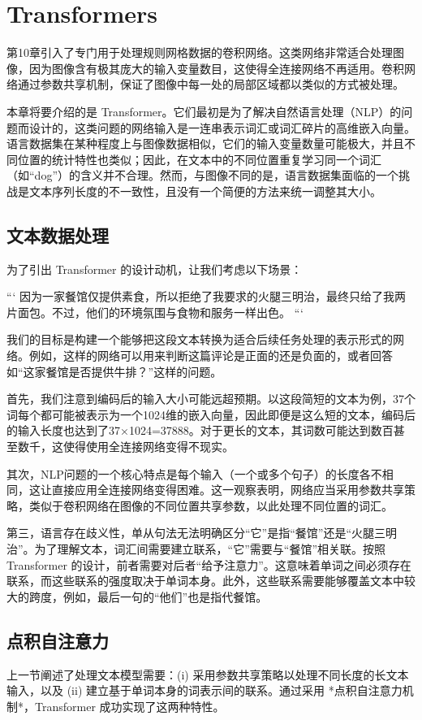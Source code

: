 \chapter{Transformers}

第10章引入了专门用于处理规则网格数据的卷积网络。这类网络非常适合处理图像，因为图像含有极其庞大的输入变量数目，这使得全连接网络不再适用。卷积网络通过参数共享机制，保证了图像中每一处的局部区域都以类似的方式被处理。

本章将要介绍的是 Transformer。它们最初是为了解决自然语言处理（NLP）的问题而设计的，这类问题的网络输入是一连串表示词汇或词汇碎片的高维嵌入向量。语言数据集在某种程度上与图像数据相似，它们的输入变量数量可能极大，并且不同位置的统计特性也类似；因此，在文本中的不同位置重复学习同一个词汇（如“dog”）的含义并不合理。然而，与图像不同的是，语言数据集面临的一个挑战是文本序列长度的不一致性，且没有一个简便的方法来统一调整其大小。

\section{文本数据处理}
为了引出 Transformer 的设计动机，让我们考虑以下场景：

```
因为一家餐馆仅提供素食，所以拒绝了我要求的火腿三明治，最终只给了我两片面包。不过，他们的环境氛围与食物和服务一样出色。
```

我们的目标是构建一个能够把这段文本转换为适合后续任务处理的表示形式的网络。例如，这样的网络可以用来判断这篇评论是正面的还是负面的，或者回答如“这家餐馆是否提供牛排？”这样的问题。

首先，我们注意到编码后的输入大小可能远超预期。以这段简短的文本为例，37个词每个都可能被表示为一个1024维的嵌入向量，因此即便是这么短的文本，编码后的输入长度也达到了37×1024=37888。对于更长的文本，其词数可能达到数百甚至数千，这使得使用全连接网络变得不现实。

其次，NLP问题的一个核心特点是每个输入（一个或多个句子）的长度各不相同，这让直接应用全连接网络变得困难。这一观察表明，网络应当采用参数共享策略，类似于卷积网络在图像的不同位置共享参数，以此处理不同位置的词汇。

第三，语言存在歧义性，单从句法无法明确区分“它”是指“餐馆”还是“火腿三明治”。为了理解文本，词汇间需要建立联系，“它”需要与“餐馆”相关联。按照 Transformer 的设计，前者需要对后者“给予注意力”。这意味着单词之间必须存在联系，而这些联系的强度取决于单词本身。此外，这些联系需要能够覆盖文本中较大的跨度，例如，最后一句的“他们”也是指代餐馆。

\section{点积自注意力}
上一节阐述了处理文本模型需要：(i) 采用参数共享策略以处理不同长度的长文本输入，以及 (ii) 建立基于单词本身的词表示间的联系。通过采用 *点积自注意力机制*，Transformer 成功实现了这两种特性。


